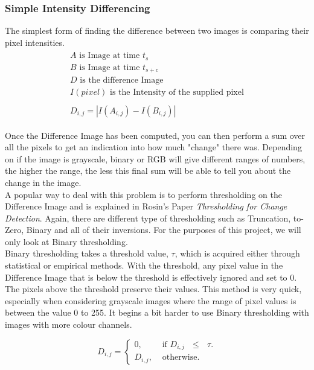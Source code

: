 \documentclass[11pt]{report}
\begin{document}
\subsubsection*{Simple Intensity Differencing}
The simplest form of finding the difference between two images is comparing 
their pixel intensities. 
\begin{align}
	\begin{split}
		A \text{ is Image at time } t_{s} \\
		B \text{ is Image at time } t_{s+c} \\
		D \text{ is the difference Image } \\
		I(pixel) \text{ is the Intensity of the supplied pixel} \\
		\\
		D_{i,j} = | I(A_{i,j}) - I(B_{i,j}) | 	
	\end{split}
\end{align} 

Once the Difference Image has been computed, you can then perform a 
sum over all the pixels to get an indication into how much "change"
there was. Depending on if the image is grayscale, binary or RGB will
give different ranges of numbers, the higher the range, the less
this final sum will be able to tell you about the change in the image.
\\
A popular way to deal with this problem is to perform thresholding on
the Difference Image and is explained in Rosin's Paper
\textit{Thresholding for Change Detection}\cite{Rosin}. 
Again, there are different type of thresholding
such as Truncation, to-Zero, Binary and all of their inversions. 
For the purposes of this project, we will only look at Binary 
thresholding. \\

Binary thresholding takes a threshold value, $\tau$, which is 
acquired either through statistical or empirical methods. With
the threshold, any pixel value in the Difference Image that is below
the threshold is effectively ignored and set to 0. The pixels above
the threshold preserve their values. This method is very quick,
especially when considering grayscale images where the range of
pixel values is between the value 0 to 255. It begins a bit harder
to use Binary thresholding with images with more colour channels.

\begin{equation}
	D_{i,j} = 
	\begin{cases}
	0, & \text{ if $D_{i,j}$ $\leq$ $\tau$}. \\
	D_{i,j}, & \text{ otherwise}.
	\end{cases}
\end{equation}
\end{document}
